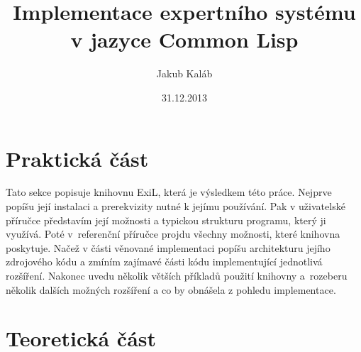 \documentclass[12pt]{article}
\title{Implementace expertního systému v jazyce Common Lisp}
\author{Jakub Kaláb}
\date{31.12.2013}
\begin{document}
\maketitle
\renewcommand\listoflistingscaption{Seznam příkladů}
\renewcommand\listingscaption{Příklad}
\listoflistings
{}

\nocite{introduction}
\nocite{paradigms}
\nocite{doorenbos}
\nocite{practical}
\nocite{clips}
\nocite{clhs}
\nocite{expert-system}
\nocite{rete}

\clearpage


\clearpage
\section{Praktická část}

Tato sekce popisuje knihovnu ExiL\footnotemark, která je výsledkem této práce.
Nejprve popíšu její instalaci a prerekvizity nutné k jejímu používání. Pak v
uživatelské příručce představím její možnosti a typickou strukturu programu,
který ji využívá.  Poté v~referenční příručce projdu všechny možnosti, které
knihovna poskytuje.  Načež v části věnované implementaci popíšu architekturu
jejího zdrojového kódu a zmíním zajímavé části kódu implementující jednotlivá
rozšíření.  Nakonec uvedu několik větších příkladů použití knihovny a~rozeberu
několik dalších možných rozšíření a co by obnášela z pohledu implementace.




\clearpage

\clearpage

\clearpage


\clearpage
\section{Teoretická část}


\clearpage

% 

\end{document}
